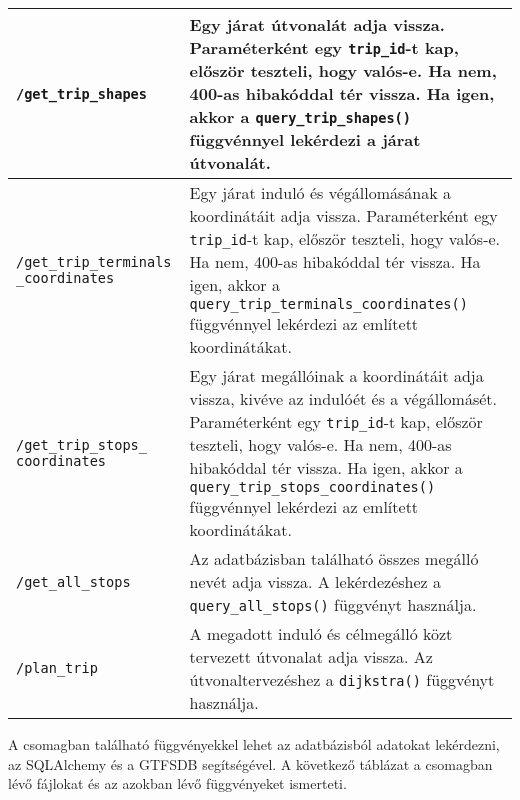 \begin{longtable}{|p{4.5cm}|p{9cm}|}
\hline
\texttt{/get\_trip\_shapes} &
Egy járat útvonalát adja vissza. Paraméterként egy \texttt{trip\_id}-t kap, először teszteli, hogy valós-e. Ha nem, 400-as hibakóddal tér vissza. Ha igen, akkor a \texttt{query\_trip\_shapes()} függvénnyel lekérdezi a járat útvonalát. \\
\hline
\texttt{/get\_trip\_terminals} \texttt{\_coordinates} &
Egy járat induló és végállomásának a koordinátáit adja vissza. Paraméterként egy \texttt{trip\_id}-t kap, először teszteli, hogy valós-e. Ha nem, 400-as hibakóddal tér vissza. Ha igen, akkor a \texttt{query\_trip\_terminals\_coordinates()} függvénnyel lekérdezi az említett koordinátákat. \\
\hline
\texttt{/get\_trip\_stops\_} \texttt{coordinates} &
Egy járat megállóinak a koordinátáit adja vissza, kivéve az indulóét és a végállomásét. Paraméterként egy \texttt{trip\_id}-t kap, először teszteli, hogy valós-e. Ha nem, 400-as hibakóddal tér vissza. Ha igen, akkor a \texttt{query\_trip\_stops\_coordinates()} függvénnyel lekérdezi az említett koordinátákat. \\
\hline
\texttt{/get\_all\_stops} &
Az adatbázisban található összes megálló nevét adja vissza. A lekérdezéshez a \texttt{query\_all\_stops()} függvényt használja. \\
\hline
\texttt{/plan\_trip} &
A megadott induló és célmegálló közt tervezett útvonalat adja vissza. Az útvonaltervezéshez a \texttt{dijkstra()} függvényt használja. \\
\hline
\end{longtable}


A csomagban található függvényekkel lehet az adatbázisból adatokat lekérdezni, az SQLAlchemy és a GTFSDB segítségével. A következő táblázat a csomagban lévő fájlokat és az azokban lévő függvényeket ismerteti.

\newpage

